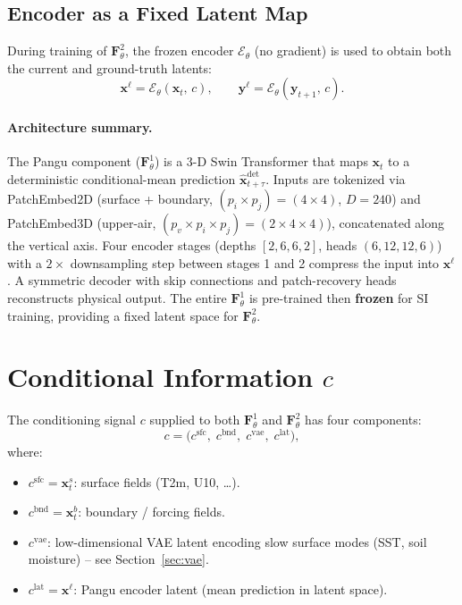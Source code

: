 \documentclass[11pt]{article}
\begin{document}
\subsection{Encoder as a Fixed Latent Map}

During training of $\mathbf{F}^2_\theta$, the frozen encoder $\mathcal{E}_\theta$
(no gradient) is used to obtain both the current and ground-truth latents:
\begin{equation}
  \mathbf{x}^{\ell}
    = \mathcal{E}_\theta(\mathbf{x}_t,\,c),
  \qquad
  \mathbf{y}^{\ell}
    = \mathcal{E}_\theta(\mathbf{y}_{t+1},\,c).
\end{equation}

\paragraph{Architecture summary.}
The Pangu component ($\mathbf{F}^1_\theta$) is a 3-D Swin Transformer that maps
$\mathbf{x}_t$ to a deterministic conditional-mean prediction
$\hat{\mathbf{x}}_{t+\tau}^{\mathrm{det}}$.  Inputs are tokenized via
PatchEmbed2D (surface + boundary, $(p_i\times p_j)=(4\times4)$, $D=240$) and
PatchEmbed3D (upper-air, $(p_v\times p_i\times p_j)=(2\times4\times4)$),
concatenated along the vertical axis.  Four encoder stages (depths
$[2,6,6,2]$, heads $(6,12,12,6)$) with a $2\times$ downsampling step between
stages 1 and 2 compress the input into $\mathbf{x}^{\ell}$.  A symmetric
decoder with skip connections and patch-recovery heads reconstructs physical
output.  The entire $\mathbf{F}^1_\theta$ is pre-trained then \textbf{frozen}
for SI training, providing a fixed latent space for $\mathbf{F}^2_\theta$.

\section{Conditional Information $c$}

The conditioning signal $c$ supplied to both $\mathbf{F}^1_\theta$ and
$\mathbf{F}^2_\theta$ has four components:
\begin{equation}
  c = \bigl(c^{\mathrm{sfc}},\;c^{\mathrm{bnd}},\;c^{\mathrm{vae}},\;
            c^{\mathrm{lat}}\bigr),
\end{equation}
where:
\begin{itemize}
  \item $c^{\mathrm{sfc}} = \mathbf{x}_t^s$\;: surface fields (T2m, U10, \ldots).
  \item $c^{\mathrm{bnd}} = \mathbf{x}_t^b$\;: boundary / forcing fields.
  \item $c^{\mathrm{vae}}$\;: low-dimensional VAE latent encoding slow surface
        modes (SST, soil moisture) -- see Section~\ref{sec:vae}.
  \item $c^{\mathrm{lat}} = \mathbf{x}^{\ell}$\;: Pangu encoder latent
        (mean prediction in latent space).
\end{itemize}
\end{document}
